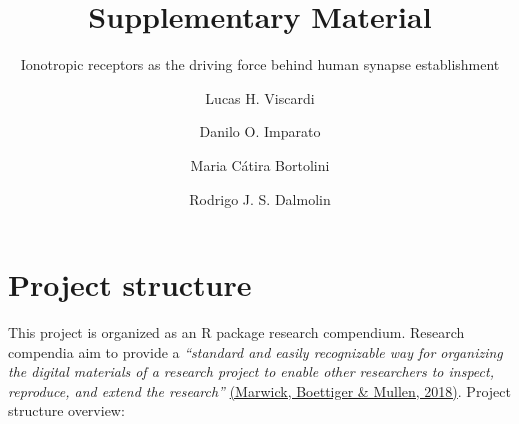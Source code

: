 \documentclass[
]{article}
\title{Supplementary Material}
\subtitle{Ionotropic receptors as the driving force behind human synapse
establishment}
\author{Lucas H. Viscardi \and Danilo O. Imparato \and Maria Cátira Bortolini \and Rodrigo J. S. Dalmolin}
\date{}
\begin{document}
\maketitle

{
\setcounter{tocdepth}{3}
\tableofcontents
}
\hypertarget{project-structure}{%
\section{Project structure}\label{project-structure}}

This project is organized as an R package research compendium. Research
compendia aim to provide a \emph{``standard and easily recognizable way
for organizing the digital materials of a research project to enable
other researchers to inspect, reproduce, and extend the research''}
\href{https://doi.org/10.1080/00031305.2017.1375986}{(Marwick, Boettiger
\& Mullen, 2018)}. Project structure overview:
\end{document}
